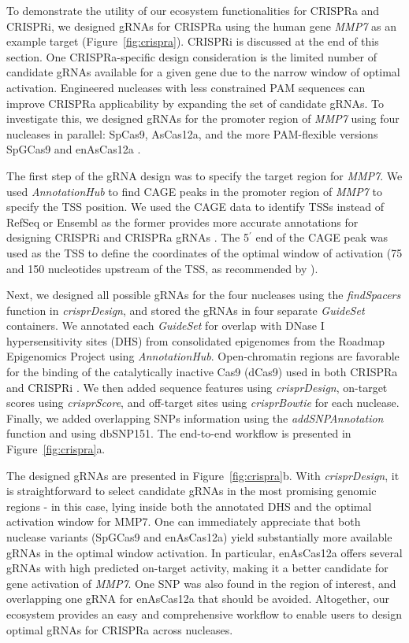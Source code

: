 \documentclass[pdftex,english,10pt]{article}
\begin{document}
To demonstrate the utility of our ecosystem functionalities for CRISPRa and CRISPRi, we designed gRNAs for CRISPRa using the human gene \textit{MMP7} as an example target (Figure~\ref{fig:crispra}). CRISPRi is discussed at the end of this section. One CRISPRa-specific design consideration is the limited number of candidate gRNAs available for a given gene due to the narrow window of optimal activation. 
Engineered nucleases with less constrained PAM sequences can improve CRISPRa applicability by expanding the set of candidate gRNAs. 
To investigate this, we designed gRNAs for the promoter region of \textit{MMP7} using four nucleases in parallel: SpCas9, AsCas12a, and the more PAM-flexible versions SpGCas9 \citep{spg} and enAsCas12a \citep{enpamgb}. 

The first step of the gRNA design was to specify the target region for \textit{MMP7}. 
We used \textit{AnnotationHub} to find CAGE peaks in the promoter region of \textit{MMP7} to specify the TSS position. We used the CAGE data to identify TSSs instead of RefSeq or Ensembl as the former provides more accurate annotations for designing CRISPRi and CRISPRa gRNAs \citep{radzisheuskaya2016optimizing}.
The 5$^\prime$ end of the CAGE peak was used as the TSS to define the coordinates of the optimal window of activation (75 and 150 nucleotides upstream of the TSS, as recommended by \citet{sanson2018optimized}). 

Next, we designed all possible gRNAs for the four nucleases using the \textit{findSpacers} function in \textit{crisprDesign}, and stored the gRNAs in four separate \textit{GuideSet} containers. We annotated each \textit{GuideSet} for overlap with DNase I hypersensitivity sites (DHS) from consolidated epigenomes from the Roadmap Epigenomics Project \citep{kundaje2015integrative} using \textit{AnnotationHub}. Open-chromatin regions are favorable for the binding of the catalytically inactive Cas9 (dCas9) used in both CRISPRa and CRISPRi \citep{kuscu2014genome,wu2014genome}. We then added sequence features using \textit{crisprDesign}, on-target scores using \textit{crisprScore}, and off-target sites using \textit{crisprBowtie} for each nuclease. Finally, we added overlapping SNPs information using the \textit{addSNPAnnotation} function and using dbSNP151. The end-to-end workflow is presented in Figure~\ref{fig:crispra}a.

The designed gRNAs are presented in Figure~\ref{fig:crispra}b. 
With \textit{crisprDesign}, it is straightforward to select candidate gRNAs in the most promising genomic regions - in this case, lying inside both the annotated DHS and the optimal activation window for MMP7. One can immediately appreciate that both nuclease variants (SpGCas9 and enAsCas12a) yield substantially more available gRNAs in the optimal window activation. In particular, enAsCas12a offers several gRNAs with high predicted on-target activity, making it a better candidate for gene activation of \textit{MMP7}. One SNP was also found in the region of interest, and overlapping one gRNA for enAsCas12a that should be avoided. Altogether, our ecosystem provides an easy and comprehensive workflow to enable users to design optimal gRNAs for CRISPRa across nucleases. 
\end{document}

